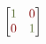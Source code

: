 \documentclass{standalone}
\begin{document}
\color{Silver}
$\displaystyle
\begin{bmatrix}
\color{DarkOliveGreen}1 & \color{Maroon}0\\
\color{Maroon}0 & \color{DarkOliveGreen}1
\end{bmatrix}
$
\end{document}
